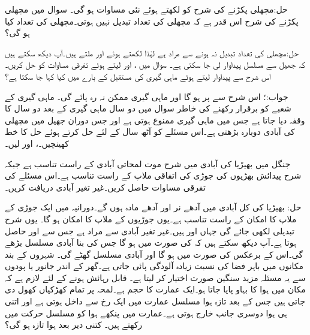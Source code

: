 حل:مچھلی پکڑنے کی شرح کو  لکھتے ہوئے نئی مساوات  ہو گی۔ 
سوال  میں مچھلی پکڑنے کی شرح اس قدر ہے کہ مچھلی کی تعداد تبدیل نہیں ہوتی۔مچھلی کی تعداد کیا ہو گی؟

حل:مچھلی کی تعداد تبدیل نہ ہونے سے مراد  ہے لہٰذا  لکھتے ہوئے  اور  ملتے ہیں۔آپ دیکھ سکتے ہیں کہ جھیل سے مسلسل  پیداوار لی جا سکتی ہے۔
سوال  میں ،  اور  لیتے ہوئے تفرقی مساوات کو حل کریں۔ اس شرح سے پیداوار لیتے ہوئے ماہی گیری کی مستقبل کے بارے میں کیا کہا جا سکتا ہے؟

جواب:؛ اس شرح سے  پر  ہو گا اور ماہی گیری ممکن نہ رہ پائے گی۔
ماہی گیری کے شعبے کو برقرار رکھنے کی خاطر سوال  میں دو سال ماہی گیری کے بعد دو سال کا وقفہ دیا جاتا ہے جس میں ماہی گیری ممنوع ہوتی ہے اور جس دوران جھیل میں مچھلی کی آبادی دوبارہ بڑھتی ہے۔اس مسئلے کو آٹھ سال کے لئے حل کرتے ہوئے حل کا خط کھینچیں۔،  اور  لیں۔
  

جنگل میں بھیڑیا کی آبادی میں شرح موت لمحاتی آبادی کے راست تناسب ہے جبکہ شرح پیدائش بھڑیوں کی جوڑی کی  اتفاقی ملاپ کے راست تناسب ہے۔اس مسئلے کی تفرقی مساوات حاصل کریں۔غیر تغیر آبادی دریافت کریں۔

 حل: بھیڑیا کی کل آبادی  میں آدھے نر اور آدھے مادہ ہوں گے۔دورانیہ  میں ایک جوڑی کے ملاپ کا امکان   کے راست تناسب ہے۔یوں  جوڑیوں کے ملاپ کا امکان  ہو گا۔ یوں شرح تبدیلی  لکھی جائے گی جہاں  اور  ہیں۔غیر تغیر آبادی سے مراد  ہے  جس سے  اور  حاصل ہوتا ہے۔آپ دیکھ سکتے ہیں کہ  کی صورت میں  ہو گا جس کی بنا آبادی مسلسل بڑھے گی۔اس کے برعکس  کی صورت میں  ہو گا اور آبادی مسلسل گھٹے گی۔
شہروں کے بند مکانوں میں باہر فضا کی نسبت زیادہ  آلودگی پائی جاتی ہے۔گھر کے اندر جانور یا پودوں سے یہ مسئلہ مزید سنگین صورت اختیار کر لیتا ہے۔ قابل رہائش ہونے کے لئے لازم ہے کہ مکان میں ہوا کا بہاو پایا جاتا ہو۔ایک عمارت کا حجم  ہے۔لمحہ  پر تمام کھڑکیاں کھول دی جاتی ہیں جس کے بعد
   تازہ ہوا مسلسل عمارت میں ایک رخ سے داخل ہوتی ہے اور اتنی ہی ہوا دوسری جانب خارج ہوتی ہے۔عمارت میں پنکھے ہوا کو مسلسل حرکت میں رکھتے ہیں۔ کتنی دیر بعد  ہوا تازہ ہو گی؟

